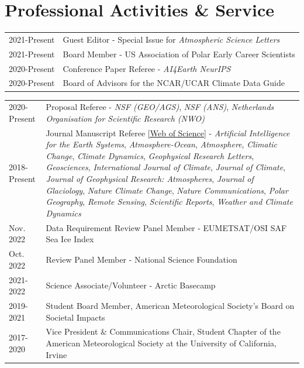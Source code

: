 \documentclass[margin,line,palatino,courier,10pt]{res}
\begin{document}
\begin{resume}
\noindent\textcolor{Cerulean}{\makebox[\linewidth][r]{\rule{\textwidth}{5pt}}}
\section{\sc \textcolor{Cerulean}{\large{\textbf{Professional Activities \& Service}}}}
\vspace*{0.05in}
\begin{tabular}{@{}p{0.9in}p{4in}}
2021-Present & Guest Editor - Special Issue for \textit{Atmospheric Science Letters}\\
2021-Present & Board Member - US Association of Polar Early Career Scientists\\
2020-Present & Conference Paper Referee - \textit{AI4Earth NeurIPS}\\
2020-Present & Board of Advisors for the NCAR/UCAR Climate Data Guide\\
\end{tabular}
\begin{tabular}{@{}p{0.9in}p{4in}}
2020-Present & Proposal Referee - \textit{NSF (GEO/AGS)}, \textit{NSF (ANS)}, \textit{Netherlands Organisation for Scientific Research (NWO)}\\
2018-Present & Journal Manuscript Referee \href{https://www.webofscience.com/wos/author/record/J-4764-2019}{[Web of Science]} - \textit{Artificial Intelligence for the Earth Systems}, \textit{Atmosphere-Ocean}, \textit{Atmosphere}, \textit{Climatic Change}, \textit{Climate Dynamics}, \textit{Geophysical Research Letters}, \textit{Geosciences}, \textit{International Journal of Climate}, \textit{Journal of Climate}, \textit{Journal of Geophysical Research: Atmospheres}, \textit{Journal of Glaciology}, \textit{Nature Climate Change}, \textit{Nature Communications}, \textit{Polar Geography}, \textit{Remote Sensing}, \textit{Scientific Reports}, \textit{Weather and Climate Dynamics} \\
Nov. 2022 & Data Requirement Review Panel Member -  EUMETSAT/OSI SAF Sea Ice Index\\ 
Oct. 2022 & Review Panel Member - National Science Foundation\\
2021-2022 & Science Associate/Volunteer - Arctic Basecamp\\
2019-2021& Student Board Member, American Meteorological Society's Board on Societal Impacts\\
2017-2020 & Vice President \& Communications Chair, Student Chapter of the American Meteorological Society at the University of California, Irvine\\

\end{tabular}
\end{resume}
\end{document}
